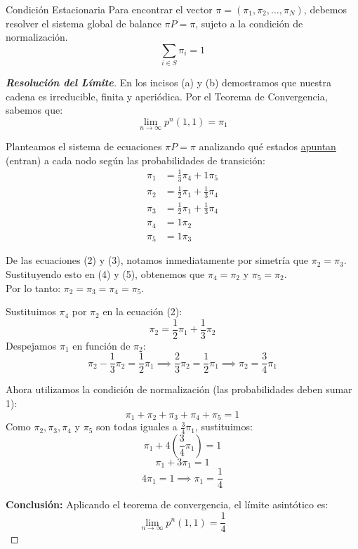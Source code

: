 \documentclass[10pt,a4paper]{article}
\begin{document}
\vspace{3mm}

\begin{alerta}{Condición Estacionaria}
    Para encontrar el vector $\pi = (\pi_1, \pi_2, \dots, \pi_N)$, debemos resolver el sistema global de balance $\pi P = \pi$, sujeto a la condición de normalización.
    \[ \sum_{i \in S} \pi_i = 1\]
\end{alerta}

\vspace{5mm}

\begin{proof}[\textbf{Resolución del Límite}]
    En los incisos (a) y (b) demostramos que nuestra cadena es irreducible, finita y aperiódica. Por el Teorema de Convergencia, sabemos que:
    \[ \lim_{n \to \infty} p^n(1, 1) = \pi_1 \]
    
    Planteamos el sistema de ecuaciones $\pi P = \pi$ analizando qué estados \ul{apuntan} (entran) a cada nodo según las probabilidades de transición:
    \begin{align}
        \pi_1 &= \frac{1}{3}\pi_4 + 1\pi_5 \\
        \pi_2 &= \frac{1}{2}\pi_1 + \frac{1}{3}\pi_4 \\
        \pi_3 &= \frac{1}{2}\pi_1 + \frac{1}{3}\pi_4 \\
        \pi_4 &= 1\pi_2 \\
        \pi_5 &= 1\pi_3
    \end{align}

    De las ecuaciones (2) y (3), notamos inmediatamente por simetría que $\pi_2 = \pi_3$. \\
    Sustituyendo esto en (4) y (5), obtenemos que $\pi_4 = \pi_2$ y $\pi_5 = \pi_2$. \\
    Por lo tanto: $\pi_2 = \pi_3 = \pi_4 = \pi_5$.

    Sustituimos $\pi_4$ por $\pi_2$ en la ecuación (2):
    \[ \pi_2 = \frac{1}{2}\pi_1 + \frac{1}{3}\pi_2 \]
    Despejamos $\pi_1$ en función de $\pi_2$:
    \[ \pi_2 - \frac{1}{3}\pi_2 = \frac{1}{2}\pi_1 \implies \frac{2}{3}\pi_2 = \frac{1}{2}\pi_1 \implies \pi_2 = \frac{3}{4}\pi_1 \]

    Ahora utilizamos la condición de normalización (las probabilidades deben sumar 1):
    \[ \pi_1 + \pi_2 + \pi_3 + \pi_4 + \pi_5 = 1 \]
    Como $\pi_2, \pi_3, \pi_4$ y $\pi_5$ son todas iguales a $\frac{3}{4}\pi_1$, sustituimos:
    \[ \pi_1 + 4\left(\frac{3}{4}\pi_1\right) = 1 \]
    \[ \pi_1 + 3\pi_1 = 1 \]
    \[ 4\pi_1 = 1 \implies \pi_1 = \frac{1}{4} \]

    \textbf{Conclusión:}
    Aplicando el teorema de convergencia, el límite asintótico es:
    \[ \lim_{n \to \infty} p^n(1, 1) = \frac{1}{4} \]
\end{proof}
\end{document}
